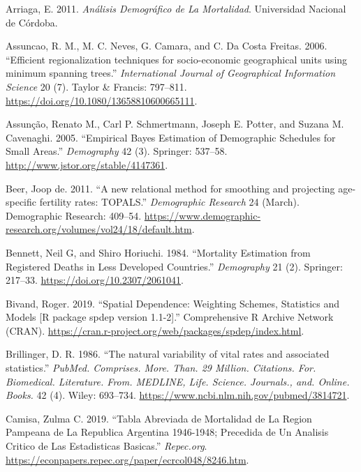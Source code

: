\documentclass[12pt,]{article}
\begin{document}
\hypertarget{refs}{}
\leavevmode\hypertarget{ref-Arriaga2011}{}%
Arriaga, E. 2011. \emph{Análisis Demográfico de La Mortalidad}.
Universidad Nacional de Córdoba.

\leavevmode\hypertarget{ref-AssunCao2006}{}%
Assuncao, R. M., M. C. Neves, G. Camara, and C. Da Costa Freitas. 2006.
``Efficient regionalization techniques for socio-economic geographical
units using minimum spanning trees.'' \emph{International Journal of
Geographical Information Science} 20 (7). Taylor \& Francis: 797--811.
\url{https://doi.org/10.1080/13658810600665111}.

\leavevmode\hypertarget{ref-Assuncao2005}{}%
Assunção, Renato M., Carl P. Schmertmann, Joseph E. Potter, and Suzana
M. Cavenaghi. 2005. ``Empirical Bayes Estimation of Demographic
Schedules for Small Areas.'' \emph{Demography} 42 (3). Springer:
537--58. \url{http://www.jstor.org/stable/4147361}.

\leavevmode\hypertarget{ref-deBeer2011}{}%
Beer, Joop de. 2011. ``A new relational method for smoothing and
projecting age-specific fertility rates: TOPALS.'' \emph{Demographic
Research} 24 (March). Demographic Research: 409--54.
\url{https://www.demographic-research.org/volumes/vol24/18/default.htm}.

\leavevmode\hypertarget{ref-Bennett_Horiuchi_1984}{}%
Bennett, Neil G, and Shiro Horiuchi. 1984. ``Mortality Estimation from
Registered Deaths in Less Developed Countries.'' \emph{Demography} 21
(2). Springer: 217--33. \url{https://doi.org/10.2307/2061041}.

\leavevmode\hypertarget{ref-Bivand2019}{}%
Bivand, Roger. 2019. ``Spatial Dependence: Weighting Schemes, Statistics
and Models {[}R package spdep version 1.1-2{]}.'' Comprehensive R
Archive Network (CRAN).
\url{https://cran.r-project.org/web/packages/spdep/index.html}.

\leavevmode\hypertarget{ref-Brillinger1986}{}%
Brillinger, D. R. 1986. ``The natural variability of vital rates and
associated statistics.'' \emph{PubMed. Comprises. More. Than. 29
Million. Citations. For. Biomedical. Literature. From. MEDLINE, Life.
Science. Journals., and. Online. Books.} 42 (4). Wiley: 693--734.
\url{https://www.ncbi.nlm.nih.gov/pubmed/3814721}.

\leavevmode\hypertarget{ref-Camisa_2019}{}%
Camisa, Zulma C. 2019. ``Tabla Abreviada de Mortalidad de La Region
Pampeana de La Republica Argentina 1946-1948; Precedida de Un Analisis
Critico de Las Estadisticas Basicas.'' \emph{Repec.org}.
\url{https://econpapers.repec.org/paper/ecrcol048/8246.htm}.
\end{document}
